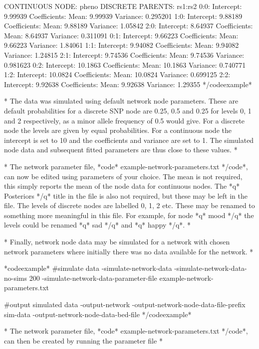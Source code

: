 CONTINUOUS NODE: pheno
 DISCRETE PARENTS: rs1:rs2
 0:0:
  Intercept: 9.99939
  Coefficients:
  Mean: 9.99939
  Variance: 0.295201
 1:0:
  Intercept: 9.88189
  Coefficients:
  Mean: 9.88189
  Variance: 1.05842
 2:0:
  Intercept: 8.64937
  Coefficients:
  Mean: 8.64937
  Variance: 0.311091
 0:1:
  Intercept: 9.66223
  Coefficients:
  Mean: 9.66223
  Variance: 1.84061
 1:1:
  Intercept: 9.94082
  Coefficients:
  Mean: 9.94082
  Variance: 1.24815
 2:1:
  Intercept: 9.74536
  Coefficients:
  Mean: 9.74536
  Variance: 0.981623
 0:2:
  Intercept: 10.1863
  Coefficients:
  Mean: 10.1863
  Variance: 0.740771
 1:2:
  Intercept: 10.0824
  Coefficients:
  Mean: 10.0824
  Variance: 0.699125
 2:2:
  Intercept: 9.92638
  Coefficients:
  Mean: 9.92638
  Variance: 1.29355
*/codeexample*

* The data was simulated using default network node parameters. These are default probabilities for a discrete SNP node are 0.25, 0.5 and 0.25 for levels 0, 1 and 2 respectively, as a minor allele frequency of 0.5 would give. For a discrete node the levels are given by equal probabilities. For a continuous node the intercept is set to 10 and the coefficients and variance are set to 1. The simulated node data and subsequent fitted parameters are thus close to these values. *

* The network parameter file, *code* example-network-parameters.txt */code*, can now be edited using parameters of your choice. The mean is not required, this simply reports the mean of the node data for continuous nodes. The *q* Posteriors */q* title in the file is also not required, but these may be left in the file. The levels of discrete nodes are labelled 0, 1, 2 etc. These may be renamed to something more meaningful in this file. For example, for node *q* mood */q* the levels could be renamed *q* sad */q* and *q* happy */q*. *

* Finally, network node data may be simulated for a network with chosen network parameters where initially there was no data available for the network. *

*codeexample* #simulate data -simulate-network-data -simulate-network-data-no-sims 200 -simulate-network-data-parameter-file example-network-parameters.txt

#output simulated data -output-network -output-network-node-data-file-prefix sim-data -output-network-node-data-bed-file */codeexample*

* The network parameter file, *code* example-network-parameters.txt */code*, can then be created by running the parameter file *

